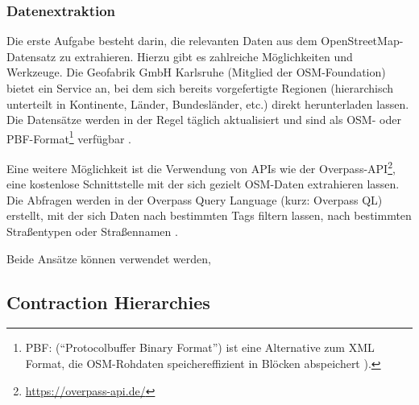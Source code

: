 \subsubsection{Datenextraktion}
Die erste Aufgabe besteht darin, die relevanten Daten aus dem OpenStreetMap-Datensatz zu
extrahieren. Hierzu gibt es zahlreiche Möglichkeiten und Werkzeuge. Die Geofabrik GmbH Karlsruhe
(Mitglied der \ac{OSM}-Foundation) bietet \ua ein Service an, bei dem sich bereits vorgefertigte
Regionen (hierarchisch unterteilt in Kontinente, Länder, Bundesländer, etc.) direkt herunterladen
lassen. Die Datensätze werden in der Regel täglich aktualisiert und sind als OSM- oder
PBF-Format\footnote{PBF: ("`Protocolbuffer Binary Format"') ist eine Alternative zum XML Format, die
    OSM-Rohdaten speichereffizient in Blöcken abspeichert \cite{osm.pbf}).} verfügbar
\cite{osm.geofabrik}.

Eine weitere Möglichkeit ist die Verwendung von \acp{API} wie \zB der
Overpass-\ac{API}\footnote{\url{https://overpass-api.de/}}, eine kostenlose Schnittstelle mit der
sich gezielt \ac{OSM}-Daten extrahieren lassen. Die Abfragen werden in der Overpass Query Language
(kurz: Overpass QL) erstellt, mit der sich Daten \ua nach bestimmten Tags filtern lassen, \zB nach
bestimmten Straßentypen oder Straßennamen \cite{osm.overpass}.

Beide Ansätze können verwendet werden,

\subsection{Contraction Hierarchies}
